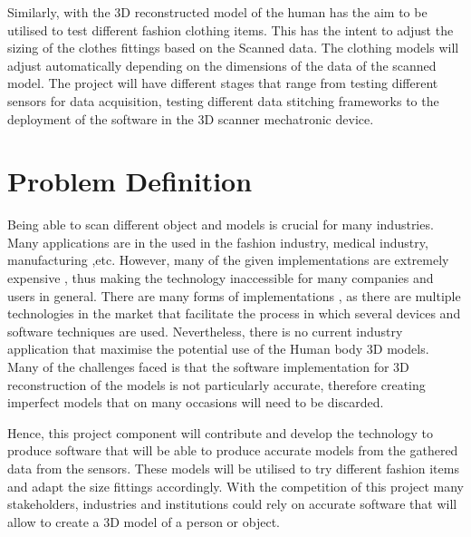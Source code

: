 \documentclass[12pt]{report}
\begin{document}
Similarly, with the 3D reconstructed model of the human has the aim to be utilised to test different fashion clothing items. This has the intent to adjust the sizing of the clothes fittings based on the Scanned data. The clothing models will adjust automatically depending on the dimensions of the data of the scanned model. 
The project will have different stages that range from testing different sensors for data acquisition, testing different data stitching frameworks to the deployment of the software in the 3D scanner mechatronic device.

\section{Problem Definition}
Being able to scan different object and models is crucial for many industries. Many applications are in the used in the fashion industry, medical industry, manufacturing ,etc. However, many of the given implementations are extremely expensive , thus making the technology inaccessible for many companies and users in general. 
There are many forms of implementations , as there are multiple technologies  in the market that facilitate the process in which several devices and software techniques are used. Nevertheless, there is no current industry application that maximise the potential use of the Human body 3D models.
Many of the challenges faced is that the software implementation for 3D reconstruction of the models is not particularly accurate, therefore creating imperfect models that on many occasions will need to be discarded.

Hence, this project component will contribute and develop the technology to produce software that will be able to produce accurate models from the gathered data from the sensors. These models will be utilised to try different fashion items and adapt the size fittings accordingly. 
With the competition of this project many stakeholders, industries and institutions could rely on  accurate software that will  allow to create a 3D model of a person or object.
\end{document}
